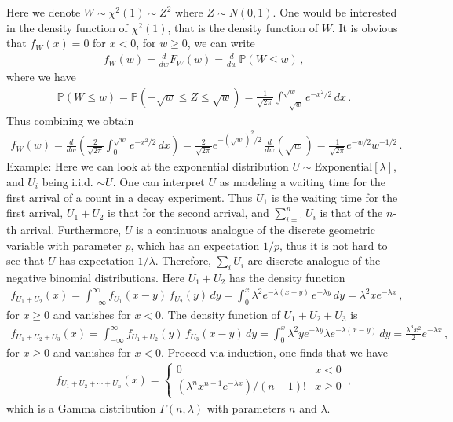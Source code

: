 \documentclass[11pt, onesided]{book}
\theoremstyle{break}
\theoremstyle{break}
\newcommand{\example}{\color{green}Example: \color{black}}
\begin{document}
Here we denote $W \sim \chi^2(1) \sim Z^2$ where $Z\sim N(0,1)$. One would be interested in the density function of $\chi^2(1)$, that is the density function of $W$. It is obvious that $f_W(x) = 0$ for $x<0$, for $w \geq 0$, we can write
\begin{align*}
f_W(w) = \frac{d}{dw}F_W(w)  = \frac{d}{dw}\,\mathbb{P}(W\leq w)\,,
\end{align*} 
where we have
\begin{align*}
\mathbb{P}(W\leq w) = \mathbb{P}(-\sqrt{w}\leq Z \leq \sqrt{w}) = \frac{1}{\sqrt{2\pi}}\int_{-\sqrt{w}}^{\sqrt{w}} e^{-x^2/2}\, dx\,.
\end{align*}
Thus combining we obtain
\begin{align*}
f_W(w) = \frac{d}{dw}\left( \frac{2}{\sqrt{2\pi}}\int_{0}^{\sqrt{w}}e^{-x^2/2}\, dx\right) = \frac{2}{\sqrt{2\pi}} e^{-(\sqrt{w})^2/2} \, \frac{d}{dw}(\sqrt{w})
 = \frac{1}{\sqrt{2\pi}} e^{-w/2}w^{-1/2} \,.
\end{align*}
\example Here we can look at the exponential distribution $U \sim \text{Exponential}[\lambda]$, and $U_i$ being i.i.d. $\sim U$. One can interpret $U$ as modeling a waiting time for the first arrival of a count in a decay experiment. Thus $U_1$ is the waiting time for the first arrival, $U_1 + U_2$ is that for the second arrival, and $\sum_{i=1}^n U_i$ is that of the $n$-th arrival. Furthermore, $U$ is a continuous analogue of the discrete geometric variable with parameter $p$, which has an expectation $1/p$, thus it is not hard to see that $U$ has expectation $1/\lambda$. Therefore, $\sum_{i}U_i$ are discrete analogue of the negative binomial distributions. Here $U_1 + U_2$ has the density function 
\begin{align*}
f_{U_1 + U_2} (x) = \int_{-\infty}^\infty f_{U_1}(x-y) \, f_{U_2}(y) \, dy = \int_{0}^x \lambda^2 e^{-\lambda (x-y)}\, e^{-\lambda y}\, dy  = \lambda^2 x e^{-\lambda x}\,,
\end{align*}
for $x \geq 0$ and vanishes for $x<0$. The density function of $U_1 + U_2 + U_3$ is 
\begin{align*}
f_{U_1 + U_2 + U_3}(x) = \int_{-\infty}^\infty f_{U_1 + U_2}(y) \, f_{U_3}(x-y)\, dy = \int_0^x \lambda^2 y e^{-\lambda y}\lambda e^{-\lambda (x-y)}\, dy =  \frac{\lambda^3x^2}{2} e^{-\lambda x}\,,
\end{align*}
for $x \geq 0$ and vanishes for $x<0$. Proceed via induction, one finds that we have
\begin{align*}
f_{U_1 + U_2 + \cdots + U_n}(x) =\begin{cases}
0 & x<0\\
(\lambda^n x^{n-1} e^{-\lambda x}) / (n-1)! & x \geq 0
\end{cases} \,,
\end{align*}
which is a Gamma distribution $\Gamma(n, \lambda)$ with parameters $n$ and $\lambda$.\\
\end{document}
